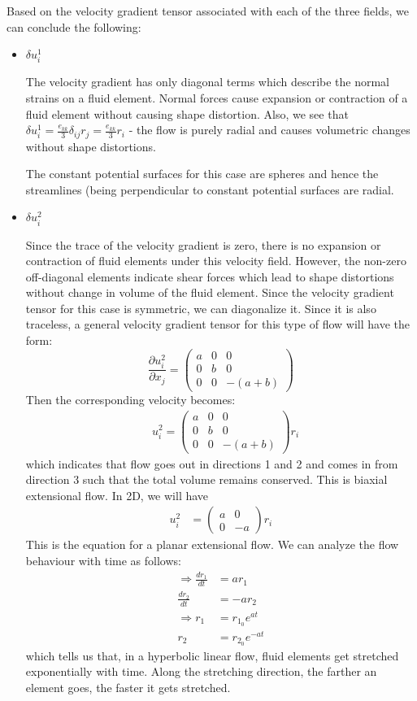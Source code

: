 \documentclass[11pt,a4paper]{article}
\newcommand{\dl}{\delta}
\newcommand{\dij}{\delta_{ij}}
\newcommand{\pd}[2]{\frac{\partial #1}{\partial #2}}
\newcommand{\1}{\vect{1}}
\newcommand{\RA}{\Rightarrow}
\begin{document}
Based on the velocity gradient tensor associated with each of the three fields, we can conclude the following:
\begin{itemize}
\item $\dl u^1_i$

The velocity gradient has only diagonal terms which describe the normal strains on a fluid element. Normal forces cause expansion or contraction of a fluid element without causing shape distortion. Also, we see that $\dl u^1_i = \frac{e_{kk}}{3}\dij r_j = \frac{e_{kk}}{3}r_i$ - the flow is purely radial and causes volumetric changes without shape distortions.

The constant potential surfaces for this case are spheres and hence the streamlines (being perpendicular to constant potential surfaces are radial.

\item $\dl u^2_i$

Since the trace of the velocity gradient is zero, there is no expansion or contraction of fluid elements under this velocity field. However, the non-zero off-diagonal elements indicate shear forces which lead to shape distortions without change in volume of the fluid element.
Since the velocity gradient tensor for this case is symmetric, we can diagonalize it. Since it is also traceless, a general velocity gradient tensor for this type of flow will have the form:
$$
\pd{u^2_i}{x_j} = 
\begin{pmatrix}
a & 0 & 0 \\
0 & b & 0 \\
0 & 0 & -(a+b)
\end{pmatrix}
$$
Then the  corresponding velocity becomes:
\begin{align*}
& u^2_i = 
\begin{pmatrix}
a & 0 & 0 \\
0 & b & 0 \\
0 & 0 & -(a+b)
\end{pmatrix}
r_i
\end{align*}
which indicates that flow goes out in directions 1 and 2 and comes in from direction 3 such that the total volume remains conserved. This is biaxial extensional flow. In 2D, we will have
\begin{align*}
u^2_i &= 
\begin{pmatrix}
a & 0\\
0 & -a
\end{pmatrix}
r_i
\end{align*}
This is the equation for a planar extensional flow. We can analyze the flow behaviour with time as follows:
\begin{align*}
\RA \frac{dr_1}{dt} &= a r_1 \\
\frac{dr_2}{dt} &= -a r_2\\
\RA r_1 &= r_{1_0}e^{at}\\
 r_2 &= r_{2_0}e^{-at}
\end{align*}
which tells us that, in a hyperbolic linear flow, fluid elements get stretched exponentially with time. Along the stretching direction, the farther an element goes, the faster it gets stretched. 


\end{itemize}
\end{document}
